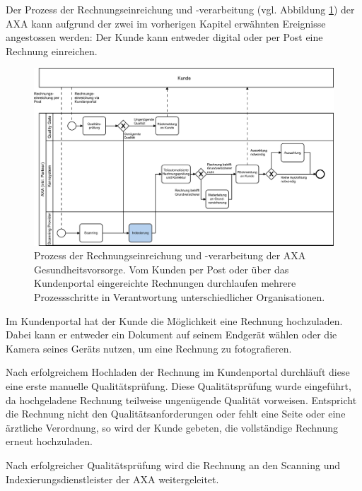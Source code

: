 Der Prozess der Rechnungseinreichung und -verarbeitung (vgl. Abbildung \ref{prozessaxa}) der AXA kann aufgrund der zwei im vorherigen Kapitel erwähnten Ereignisse angestossen werden: Der Kunde kann entweder digital oder per Post eine Rechnung einreichen. 

\begin{figure}[h]
    \captionsetup{width=.9\linewidth}
    \caption[Prozess der Rechnungseinreichung und -verarbeitung der AXA Gesundheitsvorsorge]{Prozess der Rechnungseinreichung und -verarbeitung der AXA Gesundheitsvorsorge. Vom Kunden per Post oder über das Kundenportal eingereichte Rechnungen durchlaufen mehrere Prozessschritte in Verantwortung unterschiedlicher Organisationen.}
    \label{prozessaxa}
    \centering
    \vspace{0.2cm}
    \includegraphics[width=\textwidth]{graphics/rechnungseinreichung-bpmn.pdf}
\end{figure}


Im Kundenportal hat der Kunde die Möglichkeit eine Rechnung hochzuladen. Dabei kann er entweder ein Dokument auf seinem Endgerät wählen oder die Kamera seines Geräts nutzen, um eine Rechnung zu fotografieren.

Nach erfolgreichem Hochladen der Rechnung im Kundenportal durchläuft diese eine erste manuelle Qualitätsprüfung. Diese Qualitätsprüfung wurde eingeführt, da hochgeladene Rechnung teilweise ungenügende Qualität vorweisen. Entspricht die Rechnung nicht den Qualitätsanforderungen oder fehlt eine Seite oder eine ärztliche Verordnung, so wird der Kunde gebeten, die vollständige Rechnung erneut hochzuladen.

Nach erfolgreicher Qualitätsprüfung wird die Rechnung an den Scanning und Indexierungsdienstleister der AXA weitergeleitet.

